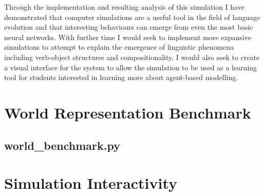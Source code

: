 \documentclass[12pt,a4paper]{report}
\begin{document}
Through the implementation and resulting analysis of this simulation I have demonstrated that computer simulations are a useful tool in the field of language evolution and that interesting behaviours can emerge from even the most basic neural networks. With further time I would seek to implement more expansive simulations to attempt to explain the emergence of linguistic phenomena including verb-object structures and compositionality. I would also seek to create a visual interface for the system to allow the simulation to be used as a learning tool for students interested in learning more about agent-based modelling. 




\appendix

\chapter{World Representation Benchmark}\label{chapter:benchmark}

\section{world\_benchmark.py}
{\scriptsize}

\chapter{Simulation Interactivity}\label{chapter:simulation-interactivity}
\end{document}
